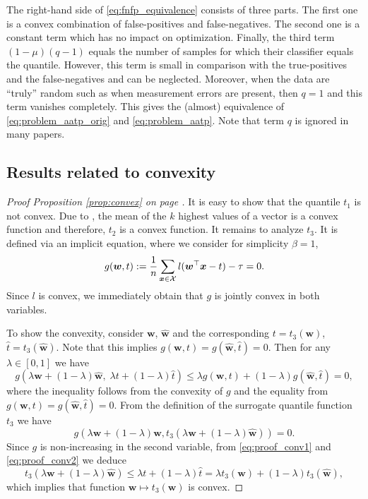 The right-hand side of \eqref{eq:fnfp_equivalence} consists of three parts. The first one is a convex combination of false-positives and false-negatives. The second one is a constant term which has no impact on optimization. Finally, the third term $(1-\mu)\left(q - 1\right)$ equals the number of samples for which their classifier equals the quantile. However, this term is small in comparison with the true-positives and the false-negatives and can be neglected. Moreover, when the data are ``truly'' random such as when measurement errors are present, then $q=1$ and this term vanishes completely. This gives the (almost) equivalence of \eqref{eq:problem_aatp_orig} and \eqref{eq:problem_aatp}. Note that term $q$ is ignored in many papers.

\subsection{Results related to convexity}

\propconvex*
\begin{proof}[Proof Proposition \ref{prop:convex} on page \pageref{prop:convex}]
  It is easy to show that the quantile $t_1$ is not convex. Due to \cite{lapin.2015}, the mean of the $k$ highest values of a vector is a convex function and therefore, $t_2$ is a convex function. It remains to analyze $t_3$. It is defined via an implicit equation, where we consider for simplicity $\beta=1$,
  \begin{equation*}
    g(\bm{w},t) := \frac{1}{n}\sum_{\bm{x} \in \mathcal{X}} l(\bm{w}^\top \bm{x}-t) - \tau = 0.
  \end{equation*}
  Since $l$ is convex, we immediately obtain that $g$ is jointly convex in both variables.

  To show the convexity, consider $\bm{w}$, $\hat{\bm{w}}$ and the corresponding $t= t_3(\bm{w})$, $\hat{t}=t_3(\hat{\bm{w}})$. Note that this implies $g(\bm{w}, t)=g(\hat{\bm{w}},\hat{t})=0$. Then for any $\lambda\in[0,1]$ we have 
  \begin{equation}\label{eq:proof_conv1}
    g(\lambda \bm{w} + (1 - \lambda)\hat{\bm{w}},\;\lambda t + (1 - \lambda)\hat{t})
    \le \lambda g(\bm{w}, t) + (1 - \lambda) g(\hat{\bm{w}}, \hat{t}) = 0,
  \end{equation}
  where the inequality follows from the convexity of $g$ and the equality from $g(\bm{w}, t) = g(\hat{\bm{w}}, \hat{t})=0.$
  From the definition of the surrogate quantile function $t_3$ we have
  \begin{equation}\label{eq:proof_conv2}
    g(\lambda\bm{w} + (1-\lambda)\hat{\bm{w}}, t_3(\lambda\bm{w} + (1-\lambda)\hat{\bm{w}})) = 0.
  \end{equation}
  Since $g$ is non-increasing in the second variable, from \eqref{eq:proof_conv1} and \eqref{eq:proof_conv2} we deduce
  \begin{equation*}
    t_3(\lambda\bm{w} + (1-\lambda)\hat{\bm{w}})
    \le \lambda t + (1-\lambda)\hat{t}
    =   \lambda t_3(\bm{w})+(1-\lambda) t_3(\hat{\bm{w}}),
  \end{equation*}
  which implies that function $\bm{w}\mapsto t_3(\bm{w})$ is convex.
\end{proof}

